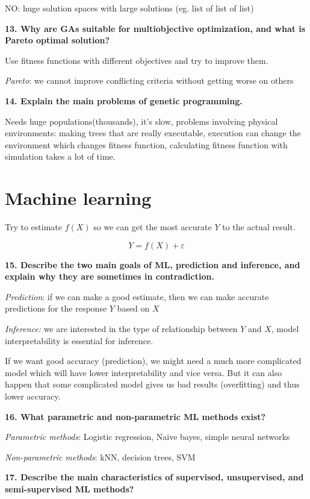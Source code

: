 NO: huge solution spaces with large solutions (eg. list of list of list)

\textbf{13. Why are GAs suitable for multiobjective optimization, and
what is Pareto optimal solution?}

Use fitness functions with different objectives and try to improve them.

\textit{Pareto}: we cannot improve conflicting criteria without
getting worse on others

\textbf{14. Explain the main problems of genetic programming.}

Needs huge populations(thousands), it's slow, problems involving
physical environments: making trees that are really executable,
execution can change the environment which changes fitness function,
calculating fitness function with simulation takes a lot of time.

\section{Machine learning}

Try to estimate $f(X)$ so we can get the most accurate $Y$ to the actual
result.

\[ Y = f(X) + \varepsilon\]

\textbf{15. Describe the two main goals of ML, prediction and inference,
and explain why they are sometimes in contradiction.}

\textit{Prediction}: if we can make a good estimate, then we can make
accurate predictions for the response $Y$ based on $X$

\textit{Inference:} we are interested in the type of relationship
between $Y$ and $X$, model interpretability is essential for inference.

If we want good accuracy (prediction), we might need a much more
complicated model which will have lower interpretability and vice versa.
But it can also happen that some complicated model gives us bad results
(overfitting) and thus lower accuracy.

\textbf{16. What parametric and non-parametric ML methods exist?}

\textit{Parametric methods}: Logistic regression, Naive bayes, simple
neural networks

\textit{Non-parametric methods}: kNN, decision trees, SVM

\textbf{17. Describe the main characteristics of supervised,
unsupervised, and semi-supervised ML methods?}

